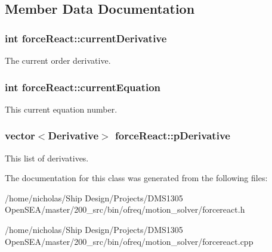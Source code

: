 \subsection{Member Data Documentation}
\hypertarget{classforce_react_a603631183ab10df81b658791657d3b4a}{
\subsubsection[{current\-Derivative}]{\setlength{\rightskip}{0pt plus 5cm}int force\-React\-::current\-Derivative\hspace{0.3cm}{\ttfamily [protected]}}}\label{classforce_react_a603631183ab10df81b658791657d3b4a}
The current order derivative. \hypertarget{classforce_react_ae90fedade4c66ee2fc45a73885187aa6}{
\subsubsection[{current\-Equation}]{\setlength{\rightskip}{0pt plus 5cm}int force\-React\-::current\-Equation\hspace{0.3cm}{\ttfamily [protected]}}}\label{classforce_react_ae90fedade4c66ee2fc45a73885187aa6}
This current equation number. \hypertarget{classforce_react_ae63f5996167638e1b23c57b50d205d67}{
\subsubsection[{p\-Derivative}]{\setlength{\rightskip}{0pt plus 5cm}vector$<${\bf Derivative}$>$ force\-React\-::p\-Derivative\hspace{0.3cm}{\ttfamily [protected]}}}\label{classforce_react_ae63f5996167638e1b23c57b50d205d67}
This list of derivatives. 

The documentation for this class was generated from the following files\-:\begin{DoxyCompactItemize}
\item 
/home/nicholas/\-Ship Design/\-Projects/\-D\-M\-S1305 Open\-S\-E\-A/master/200\-\_\-src/bin/ofreq/motion\-\_\-solver/forcereact.\-h\item 
/home/nicholas/\-Ship Design/\-Projects/\-D\-M\-S1305 Open\-S\-E\-A/master/200\-\_\-src/bin/ofreq/motion\-\_\-solver/forcereact.\-cpp\end{DoxyCompactItemize}
